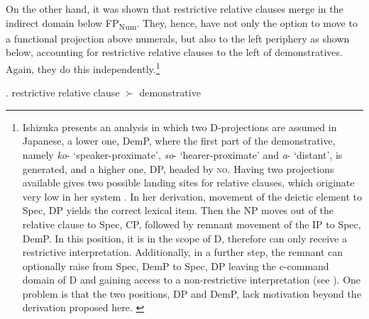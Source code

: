 \documentclass [output=book,colorlinks,citecolor=brown]{langscibook}
\begin{document}
On the other hand, it was shown that restrictive relative clauses merge in the indirect domain below FP\textsubscript{Num}. They, hence, have not only the option to move to a functional projection above numerals, but also to the left periphery as shown below, accounting for restrictive relative clauses to the left of demonstratives. Again, they do this independently.\footnote{Ishizuka presents an analysis in which two D-projections are assumed in Japanese, a lower one, DemP, where the first part of the demonstrative, namely \textit{ko}- `speaker-proximate', \textit{so}- `hearer-proximate' and \textit{a}- `distant', is generated, and a higher one, DP, headed by \textsc{no}. Having two projections available gives two possible landing sites for relative clauses, which originate very low in her system \citep{kayne:1994:anti}. In her derivation, movement of the deictic element to Spec, DP yields the correct lexical item. Then the NP moves out of the relative clause to Spec, CP, followed by remnant movement of the IP to Spec, DemP. In this position, it is in the scope of D, therefore can only receive a restrictive interpretation. Additionally, in a further step, the remnant can optionally raise from Spec, DemP to Spec, DP leaving the c-command domain of D and gaining access to a non-restrictive interpretation (see \citealt[8–9]{ishizuka:2008:RC}). One problem is that the two positions, DP and DemP, lack motivation beyond the derivation proposed here. \label{footnote ishizuka}}


 \ex. restrictive relative clause $\succ$ demonstrative\\
\end{document}
